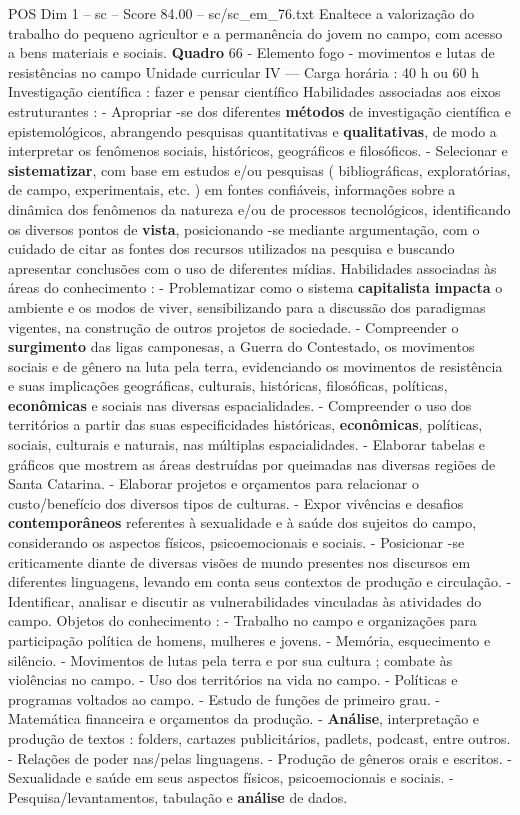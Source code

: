 \begin{textsample}{POS Dim 1 – sc – Score 84.00 – sc/sc\_em\_76.txt}
Enaltece a valorização do trabalho do pequeno agricultor e a permanência do jovem no campo, com acesso a bens materiais e sociais. \textbf{Quadro} 66 - Elemento fogo - movimentos e lutas de resistências no campo Unidade curricular IV — Carga horária : 40 h ou 60 h Investigação científica : fazer e pensar científico Habilidades associadas aos eixos estruturantes : - Apropriar -se dos diferentes \textbf{métodos} de investigação científica e epistemológicos, abrangendo pesquisas quantitativas e \textbf{qualitativas}, de modo a interpretar os fenômenos sociais, históricos, geográficos e filosóficos. - Selecionar e \textbf{sistematizar}, com base em estudos e/ou pesquisas ( bibliográficas, exploratórias, de campo, experimentais, etc. ) em fontes confiáveis, informações sobre a dinâmica dos fenômenos da natureza e/ou de processos tecnológicos, identificando os diversos pontos de \textbf{vista}, posicionando -se mediante argumentação, com o cuidado de citar as fontes dos recursos utilizados na pesquisa e buscando apresentar conclusões com o uso de diferentes mídias.
Habilidades associadas às áreas do conhecimento : - Problematizar como o sistema \textbf{capitalista} \textbf{impacta} o ambiente e os modos de viver, sensibilizando para a discussão dos paradigmas vigentes, na construção de outros projetos de sociedade. - Compreender o \textbf{surgimento} das ligas camponesas, a Guerra do Contestado, os movimentos sociais e de gênero na luta pela terra, evidenciando os movimentos de resistência e suas implicações geográficas, culturais, históricas, filosóficas, políticas, \textbf{econômicas} e sociais nas diversas espacialidades. - Compreender o uso dos territórios a partir das suas especificidades históricas, \textbf{econômicas}, políticas, sociais, culturais e naturais, nas múltiplas espacialidades. - Elaborar tabelas e gráficos que mostrem as áreas destruídas por queimadas nas diversas regiões de Santa Catarina. - Elaborar projetos e orçamentos para relacionar o custo/benefício dos diversos tipos de culturas. - Expor vivências e desafios \textbf{contemporâneos} referentes à sexualidade e à saúde dos sujeitos do campo, considerando os aspectos físicos, psicoemocionais e sociais. - Posicionar -se criticamente diante de diversas visões de mundo presentes nos discursos em diferentes linguagens, levando em conta seus contextos de produção e circulação. - Identificar, analisar e discutir as vulnerabilidades vinculadas às atividades do campo.
Objetos do conhecimento : - Trabalho no campo e organizações para participação política de homens, mulheres e jovens. - Memória, esquecimento e silêncio. - Movimentos de lutas pela terra e por sua cultura ; combate às violências no campo. - Uso dos territórios na vida no campo. - Políticas e programas voltados ao campo. - Estudo de funções de primeiro grau. - Matemática financeira e orçamentos da produção. - \textbf{Análise}, interpretação e produção de textos : folders, cartazes publicitários, padlets, podcast, entre outros. - Relações de poder nas/pelas linguagens. - Produção de gêneros orais e escritos. - Sexualidade e saúde em seus aspectos físicos, psicoemocionais e sociais. - Pesquisa/levantamentos, tabulação e \textbf{análise} de dados.

\end{textsample}
